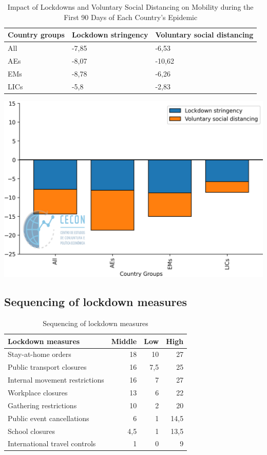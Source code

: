 \documentclass{SelfArx}
\begin{document}
\begin{table}[htbp]
\caption{\label{Vol_String}Impact of Lockdowns and Voluntary Social Distancing on Mobility during the First 90 Days of Each Country’s Epidemic}
\centering
\begin{tabular}{lll}
Country groups & Lockdown stringency & Voluntary social distancing\\
\hline
All & -7,85 & -6,53\\
AEs & -8,07 & -10,62\\
EMs & -8,78 & -6,26\\
LICs & -5,8 & -2,83\\
\hline
\end{tabular}
\end{table}

\begin{center}
\includegraphics[width=.9\linewidth]{./figs/IMF/Vol_String.png}
\end{center}

\subsection*{Sequencing of lockdown measures}
\label{sec:orgdffb5a0}
\begin{table}[htbp]
\caption{\label{Lock_measure}Sequencing of lockdown measures}
\centering
\begin{tabular}{lrrr}
\hline
Lockdown measures & Middle & Low & High\\
\hline
Stay-at-home orders & 18 & 10 & 27\\
Public transport closures & 16 & 7,5 & 25\\
Internal movement restrictions & 16 & 7 & 27\\
Workplace closures & 13 & 6 & 22\\
Gathering restrictions & 10 & 2 & 20\\
Public event cancellations & 6 & 1 & 14,5\\
School closures & 4,5 & 1 & 13,5\\
International travel controls & 1 & 0 & 9\\
\hline
\end{tabular}
\end{table}
\end{document}
